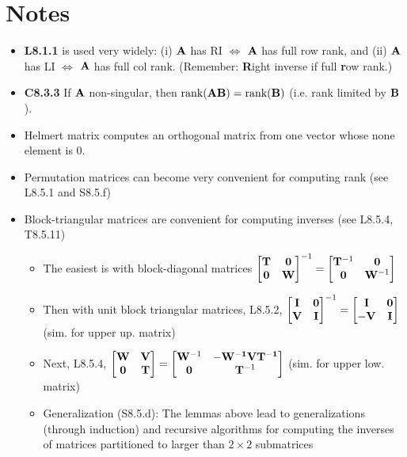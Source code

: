 \documentclass[a4paper, oneside]{book}
\begin{document}
\section*{Notes}
\begin{itemize}
\item \textbf{L8.1.1} is used very widely: (i) $\mathbf A$ has RI $\iff$ $\mathbf A$ has full row rank, and (ii) $\mathbf A$ has LI $\iff$ $\mathbf A$ has full col rank. (Remember: \textbf{R}ight inverse if full \textbf{r}ow rank.)
\item \textbf{C8.3.3} If $\mathbf A$ non-singular, then $\text{rank}(\mathbf{AB})=\text{rank}(\mathbf B)$ (i.e. rank limited by $\mathbf B$). 
\item Helmert matrix computes an orthogonal matrix from one vector whose none element is $0$.
\item Permutation matrices can become very convenient for computing rank (see L8.5.1 and S8.5.f)
\item Block-triangular matrices are convenient for computing inverses (see L8.5.4, T8.5.11)
	\begin{itemize}
	\item The easiest is with block-diagonal matrices $\begin{bmatrix}
	\mathbf{T} & \mathbf 0 \\ \mathbf 0 & \mathbf W
	\end{bmatrix}^{-1} = \begin{bmatrix}
	\mathbf{T}^{-1} & \mathbf 0 \\ \mathbf 0 & \mathbf W^{-1}
	\end{bmatrix}$
	\item Then with unit block triangular matrices, L8.5.2, $\begin{bmatrix}
	\mathbf{I} & \mathbf 0 \\ \mathbf V & \mathbf I
	\end{bmatrix}^{-1} = \begin{bmatrix}
	\mathbf{I} & \mathbf 0 \\ -\mathbf V & \mathbf I
	\end{bmatrix}$ (sim. for upper up. matrix)
	\item Next, L8.5.4, $\begin{bmatrix}
\mathbf W & \mathbf V \\ \mathbf 0 & \mathbf T
\end{bmatrix} = \begin{bmatrix}
\mathbf W^{-1} & \mathbf -\mathbf{W^{-1}VT^{-1}} \\ \mathbf 0 & \mathbf T^{-1}
\end{bmatrix}$  (sim. for upper low. matrix)
	\item Generalization (S8.5.d): The lemmas above lead to generalizations (through induction) and recursive algorithms for computing the inverses of matrices partitioned to larger than $2\times 2$ submatrices

\end{itemize}
\end{itemize}
\end{document}
